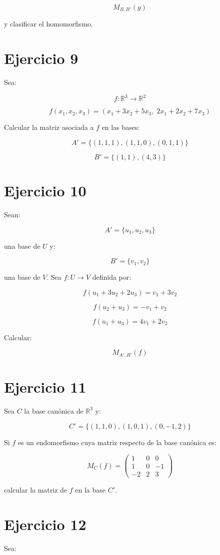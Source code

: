 \documentclass[11pt,a4paper]{article}
\newcommand{\R}{\mathbb{R}}
\begin{document}
\[
M_{B,B'}(g)
\]

y clasificar el homomorfismo.

\section{Ejercicio 9}
Sea:

\[
f:\R^3\longrightarrow\R^2
\]

\[
f(x_1,x_2,x_3)
=
(x_1+3x_2+5x_3,\;2x_1+2x_2+7x_3)
\]

Calcular la matriz asociada a $f$ en las bases:

\[
A'=
\{(1,1,1),(1,1,0),(0,1,1)\}
\]

\[
B'=
\{(1,1),(4,3)\}
\]

\section{Ejercicio 10}
Sean:

\[
A'=\{u_1,u_2,u_3\}
\]

una base de $U$ y:

\[
B'=\{v_1,v_2\}
\]

una base de $V$. Sea $f:U\to V$ definida por:

\[
f(u_1+3u_2+2u_3)=v_1+3v_2
\]

\[
f(u_2+u_3)=-v_1+v_2
\]

\[
f(u_1+u_3)=4v_1+2v_2
\]

Calcular:

\[
M_{A',B'}(f)
\]

\section{Ejercicio 11}
Sea $C$ la base canónica de $\R^3$ y:

\[
C'=
\{(1,1,0),(1,0,1),(0,-1,2)\}
\]

Si $f$ es un endomorfismo cuya matriz respecto de la base canónica es:

\[
M_C(f)=
\begin{pmatrix}
1&0&0\\
1&0&-1\\
-2&2&3
\end{pmatrix}
\]

calcular la matriz de $f$ en la base $C'$.

\section{Ejercicio 12}
Sea:
\end{document}
